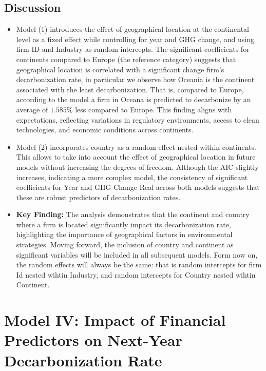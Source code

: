 \subsection{Discussion}
\begin{itemize}
    \item Model (1) introduces the effect of geographical location at the continental level as a fixed effect while controlling for year and GHG change, and using firm ID and Industry as random intercepts. The significant coefficients for continents compared to Europe (the reference category) suggests that geographical location is correlated with a significant change firm's decarbonization rate, in particular we observe how Oceania is the continent associated with the least decarbonization. That is, compared to Europe, according to the model a firm in Oceana is predicted to decarbonize by an average of $1.585 \%$ less compared to Europe. This finding aligns with expectations, reflecting variations in regulatory environments, access to clean technologies, and economic conditions across continents.
    \item Model (2) incorporates country as a random effect nested within continents. This allows to take into account the effect of geographical location in future models without increasing the degrees of freedom. Although the AIC slightly increases, indicating a more complex model, the consistency of significant coefficients for Year and GHG Change Real across both models suggests that these are robust predictors of decarbonization rates.
    \item \textbf{Key Finding:} The analysis demonstrates that the continent and country where a firm is located significantly impact its decarbonization rate, highlighting the importance of geographical factors in environmental strategies. Moving forward, the inclusion of country and continent as significant variables will be included in all subsequent models. Form now on, the random effects will always be the same: that is random intercepts for firm Id nested wihtin Industry, and random intercepts for Country nested wihtin Continent. 
\end{itemize}

 

\section{Model IV: Impact of Financial Predictors on Next-Year Decarbonization Rate}


